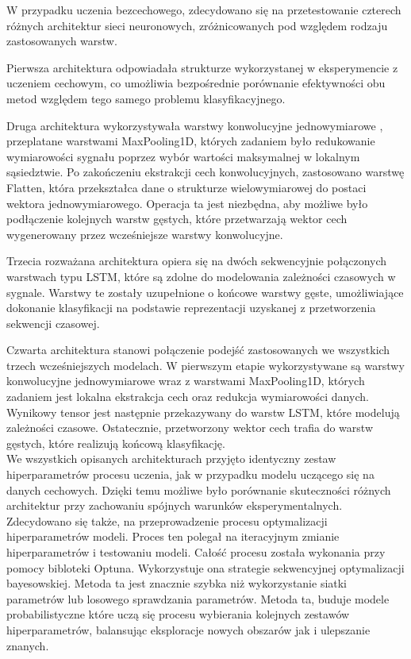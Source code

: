 \documentclass[a4paper,twoside,12pt]{book}
\begin{document}
W przypadku uczenia bezcechowego, zdecydowano się na przetestowanie czterech różnych architektur sieci neuronowych, zróżnicowanych pod względem rodzaju zastosowanych warstw.

Pierwsza architektura odpowiadała strukturze wykorzystanej w eksperymencie z uczeniem cechowym, co umożliwia bezpośrednie porównanie efektywności obu metod względem tego samego problemu klasyfikacyjnego.

Druga architektura wykorzystywała warstwy konwolucyjne jednowymiarowe , przeplatane warstwami MaxPooling1D, których zadaniem było redukowanie wymiarowości sygnału poprzez wybór wartości maksymalnej w lokalnym sąsiedztwie. Po zakończeniu ekstrakcji cech konwolucyjnych, zastosowano warstwę Flatten, która przekształca dane o strukturze wielowymiarowej do postaci wektora jednowymiarowego. Operacja ta jest niezbędna, aby możliwe było podłączenie kolejnych warstw gęstych, które przetwarzają wektor cech wygenerowany przez wcześniejsze warstwy konwolucyjne.

Trzecia rozważana architektura opiera się na dwóch sekwencyjnie połączonych warstwach typu LSTM, które są zdolne do modelowania zależności czasowych w sygnale. Warstwy te zostały uzupełnione o końcowe warstwy gęste, umożliwiające dokonanie klasyfikacji na podstawie reprezentacji uzyskanej z przetworzenia sekwencji czasowej.

Czwarta architektura stanowi połączenie podejść zastosowanych we wszystkich trzech wcześniejszych modelach. W pierwszym etapie wykorzystywane są warstwy konwolucyjne jednowymiarowe wraz z warstwami MaxPooling1D, których zadaniem jest lokalna ekstrakcja cech oraz redukcja wymiarowości danych. Wynikowy tensor jest następnie przekazywany do warstw LSTM, które modelują zależności czasowe. Ostatecznie, przetworzony wektor cech trafia do warstw gęstych, które realizują końcową klasyfikację.\\

We wszystkich opisanych architekturach przyjęto identyczny zestaw hiperparametrów procesu uczenia, jak w przypadku modelu uczącego się na danych cechowych. Dzięki temu możliwe było porównanie skuteczności różnych architektur przy zachowaniu spójnych warunków eksperymentalnych.\\

Zdecydowano się także, na przeprowadzenie procesu optymalizacji hiperparametrów modeli. Proces ten polegał na iteracyjnym zmianie hiperparametrów i testowaniu modeli. Całość procesu została wykonania przy pomocy bibloteki Optuna. Wykorzystuje ona strategie sekwencyjnej optymalizacji bayesowskiej. Metoda ta jest znacznie szybka niż wykorzystanie siatki parametrów lub losowego sprawdzania parametrów. Metoda ta, buduje modele probabilistyczne które uczą się procesu wybierania kolejnych zestawów hiperparametrów, balansując eksploracje nowych obszarów jak i ulepszanie znanych.\\
\end{document}
